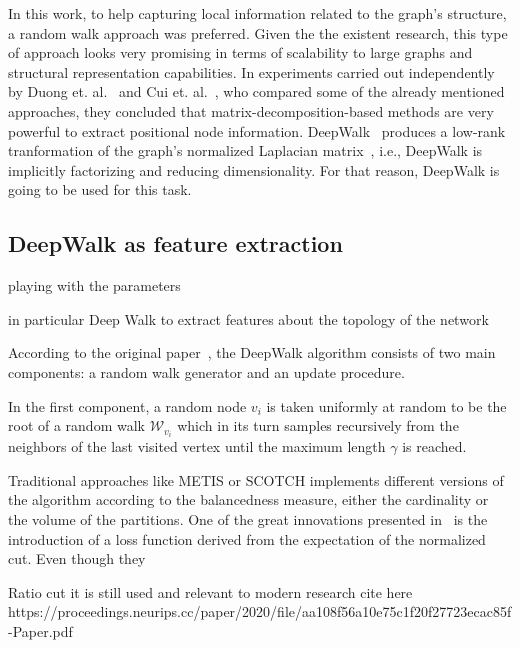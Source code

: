 In this work, to help capturing local information related to the graph's structure, a random walk approach was preferred. Given the the existent research, this type of approach looks very promising in terms of scalability to large graphs and structural representation capabilities. In experiments carried out independently by Duong et. al.~\cite{onnodefeatures} and Cui et. al.~\cite{onpositional}, who compared some of the already mentioned approaches, they concluded that matrix-decomposition-based methods are very powerful to extract positional node information. DeepWalk~\cite{deepwalk} produces a low-rank tranformation of the graph's normalized Laplacian matrix~\cite{factorizing}, i.e., DeepWalk is implicitly factorizing and reducing dimensionality. For that reason, DeepWalk is going to be used for this task.


\subsection{DeepWalk as feature extraction}

playing with the parameters

in particular Deep Walk to extract features about the topology of the network

According to the original paper~\cite{deepwalk}, the DeepWalk algorithm consists of two main components: a random walk generator and an update procedure. 

In the first component, a random node $v_i$ is taken uniformly at random to be the root of a random walk $\mathcal W_{v_i}$ which in its turn samples recursively from the neighbors of the last visited vertex until the maximum length $\gamma$ is reached.

Traditional approaches like METIS or SCOTCH implements different versions of the algorithm according to the balancedness measure, either the cardinality or the volume of the partitions. One of the great innovations presented  in~\cite{gap} is the introduction of a loss function derived from the expectation of the normalized cut. Even though they 

Ratio cut it is still used and relevant to modern research cite here https://proceedings.neurips.cc/paper/2020/file/aa108f56a10e75c1f20f27723ecac85f-Paper.pdf

